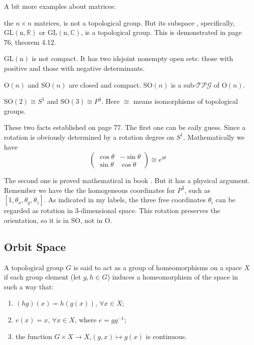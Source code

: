 A bit more examples about matrices:
\begin{ex}
     the $n\times n$ matrices, is not a
    topological group. But its subspace
    , specifically,
    $\mathrm{GL(n,\mathbb{R})}$ or $\mathrm{GL(n,\mathbb{C})}$, is a
    topological group. This is demonstrated in page 76, theorem 4.12.
\end{ex}
\begin{fact}
    $\mathrm{GL(n)}$ is not compact. It has two idsjoint nonempty open
    sets: those with positive and those with negative determinants.
\end{fact}
\begin{thm}
    $\mathrm{O}(n)$ and $\mathrm{SO}(n)$ are closed and compact.
    $\mathrm{SO}(n)$ is a sub-$\mathcal{TPG}$ of $\mathrm{O}(n)$.
\end{thm}
\begin{fact}
    $\mathrm{SO}(2)\cong S^1$ and $\mathrm{SO}(3)\cong P^3$.
    Here $\cong$ means isomorphisms of topological groups.
\end{fact}
\begin{remark}
    These two facts established on page 77. The first one can be eaily
    guess. Since a rotation is obviously determined by a rotation
    degree on $S^1$. Mathematically we have
    \begin{equation}
        \left(\begin{array} {cc}
            \cos\theta & -\sin\theta \\
            \sin\theta & \cos\theta 
        \end{array}\right) \cong e^{i\theta}
    \end{equation}

    The second one is proved mathematical in book \cite{book}. But it
    has a physical argument. Remember we have the the homogeneous
    coordinates for $P^3$, such as $[1,\theta_x,\theta_y,\theta_z]$.
    As indicated in my labels, the three free coordinates $\theta_i$
    can be regarded as rotation in 3-dimensional space. This rotation
    preserves the orientation, so it is in $\mathrm{SO}$, not in
    $\mathrm{O}$. 
\end{remark}

\subsection{Orbit Space}
\label{sec:Orbit-Space}
\begin{defi}
    A topological group $G$ is said to act as a group of
    homeomorphisms on a space $X$ if each group element (let $g,h\in G$)
    induces a homeomorphism of the space in such a way that:
    \begin{enumerate}
        \item $(hg)(x) = h(g(x)),\, \forall x\in X$;
        \item $e(x)=x,\, \forall x\in X$, where $e=gg^{-1}$;
        \item the function $G\times X\to X$,$(g,x)\mapsto g(x)$ is
            continuous.
    \end{enumerate}
\end{defi}


